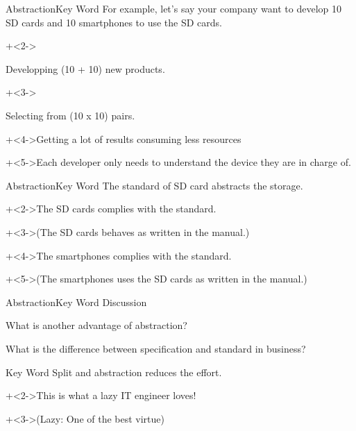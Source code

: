\begin{frame}[t]{Abstraction}{Key Word}
    For example, let's say your company want to develop 10 SD cards and 10 smartphones to use the SD cards.
    \vspace{4ex}

    \begin{itemize}
        \onslide+<2->{\item[Cost]   Developping (10 + 10) new products.}
        \onslide+<3->{\item[Usage]    Selecting from (10 x 10) pairs.}
    \end{itemize}
    \vspace{4ex}

    \onslide+<4->{Getting a lot of results consuming less resources}
    \vspace{2ex}

    \onslide+<5->{Each developer only needs to understand the device they are in charge of.}
\end{frame}


\begin{frame}{Abstraction}{Key Word}
    The standard of SD card abstracts the storage.
    \vspace{4ex}

    \onslide+<2->{The SD cards complies with the standard.}
    \vspace{2ex}

    \onslide+<3->{(The SD cards behaves as written in the manual.)}
    \vspace{4ex}

    \onslide+<4->{The smartphones complies with the standard.}
    \vspace{2ex}

    \onslide+<5->{(The smartphones uses the SD cards as written in the manual.)}
\end{frame}


\begin{frame}{Abstraction}{Key Word}
    Discussion
    \vspace{4ex}

    What is another advantage of abstraction?
    \vspace{2ex}

    What is the difference between specification and standard in business?
\end{frame}


\begin{frame}{Key Word}
    Split and abstraction reduces the effort.
    \vspace{4ex}

    \onslide+<2->{This is what a lazy IT engineer loves!}
    \vspace{2ex}

    \onslide+<3->{{\Large (Lazy: One of the best virtue)}}
\end{frame}


